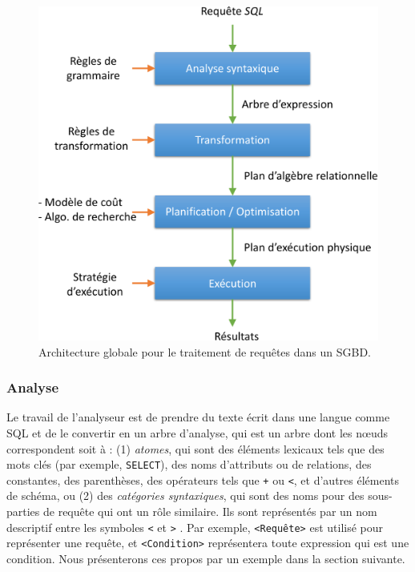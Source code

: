 \begin{figure}
\begin{center}
\includegraphics[scale=0.55]{chapitre2/chap2Fig/query-processing.pdf}
\caption{Architecture globale pour le traitement de requêtes dans un SGBD.}
 \label{fig:query-processing}
\end{center}
\end{figure}

\subsubsection{Analyse}
Le travail de l'analyseur est de prendre du texte écrit dans une langue comme SQL et de le convertir en un arbre d'analyse, qui est un arbre dont les nœuds correspondent soit à : (1) \textit{atomes}, qui sont des éléments lexicaux tels que des mots clés (par exemple, \texttt{SELECT}), des noms d'attributs ou de relations, des constantes, des parenthèses, des opérateurs tels que \texttt{+} ou \texttt{<}, et d'autres éléments de schéma, ou (2) des \textit{catégories syntaxiques}, qui sont des noms pour des sous-parties de requête qui ont un rôle similaire. Ils sont représentés par un nom descriptif entre les symboles \texttt{<} et \texttt{>} \cite{GarciaMolina08}. Par exemple, \texttt{<Requête>} est utilisé pour représenter une requête, et \texttt{<Condition>} représentera toute expression qui est une condition. Nous présenterons ces propos par un exemple dans la section suivante.

